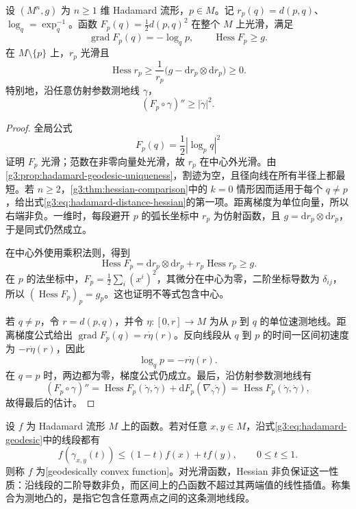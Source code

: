 \begin{proposition}\label{g3:prop:hadamard-squared-distance-convex}
	设 \((M^n,g)\) 为 \(n\ge1\) 维 Hadamard 流形，\(p\in M\)。记 \(r_p(q)=d(p,q)\)、\(\log_q=\exp_q^{-1}\)。函数 \(F_p(q)=\frac12d(p,q)^2\) 在整个 \(M\) 上光滑，满足
	\begin{equation}\label{g3:eq:hadamard-squared-distance-gradient}
		\operatorname{grad}F_p(q)=-\log_qp,\qquad
		\operatorname{Hess}F_p\ge g.
	\end{equation}
	在 \(M\setminus\{p\}\) 上，\(r_p\) 光滑且
	\begin{equation}\label{g3:eq:hadamard-distance-hessian}
		\operatorname{Hess}r_p
		\ge\frac1{r_p}\bigl(g-\mathrm dr_p\otimes\mathrm dr_p\bigr)
		\ge0.
	\end{equation}
	特别地，沿任意仿射参数测地线 \(\gamma\)，
	\[
		(F_p\circ\gamma)''\ge|\dot\gamma|^2.
	\]
\end{proposition}
\begin{proof}
	全局公式
	\[
		F_p(q)=\frac12|\log_pq|^2
	\]
	证明 \(F_p\) 光滑；范数在非零向量处光滑，故 \(r_p\) 在中心外光滑。由 \cref{g3:prop:hadamard-geodesic-uniqueness}，割迹为空，且径向线在所有半径上都最短。若 \(n\ge2\)，\cref{g3:thm:hessian-comparison}中的 \(k=0\) 情形因而适用于每个 \(q\ne p\)，给出式\eqref{g3:eq:hadamard-distance-hessian}的第一项。距离梯度为单位向量，所以右端非负。一维时，每段避开 \(p\) 的弧长坐标中 \(r_p\) 为仿射函数，且 \(g=\mathrm dr_p\otimes\mathrm dr_p\)，于是同式仍然成立。

	在中心外使用乘积法则，得到
	\[
		\operatorname{Hess}F_p
		=\mathrm dr_p\otimes\mathrm dr_p
			+r_p\operatorname{Hess}r_p\ge g.
	\]
	在 \(p\) 的法坐标中，\(F_p=\frac12\sum_i(x^i)^2\)，其微分在中心为零，二阶坐标导数为 \(\delta_{ij}\)，所以 \((\operatorname{Hess}F_p)_p=g_p\)。这也证明不等式包含中心。

	若 \(q\ne p\)，令 \(r=d(p,q)\)，并令 \(\eta:[0,r]\to M\) 为从 \(p\) 到 \(q\) 的单位速测地线。距离梯度公式给出
	\(\operatorname{grad}F_p(q)=r\dot\eta(r)\)。反向线段从 \(q\) 到 \(p\) 的时间一区间初速度为 \(-r\dot\eta(r)\)，因此
	\[
		\log_qp=-r\dot\eta(r).
	\]
	在 \(q=p\) 时，两边都为零，梯度公式仍成立。最后，沿仿射参数测地线有
	\[
		(F_p\circ\gamma)''
		=\operatorname{Hess}F_p(\dot\gamma,\dot\gamma)
			+\mathrm dF_p(\nabla_{\dot\gamma}\dot\gamma)
		=\operatorname{Hess}F_p(\dot\gamma,\dot\gamma),
	\]
	故得最后的估计。
\end{proof}

设 \(f\) 为 Hadamard 流形 \(M\) 上的函数。若对任意 \(x,y\in M\)，沿式\eqref{g3:eq:hadamard-geodesic}中的线段都有
\[
	f(\gamma_{x,y}(t))\le(1-t)f(x)+tf(y),\qquad 0\le t\le1.
\]
则称 \(f\) 为[geodesically convex function]。对光滑函数，Hessian 非负保证这一性质：沿线段的二阶导数非负，而区间上的凸函数不超过其两端值的线性插值。称集合为测地凸的，是指它包含任意两点之间的这条测地线段。

